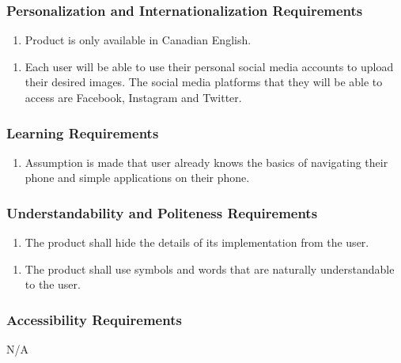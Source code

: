\documentclass[]{article}
\begin{document}
\subsubsection{Personalization and Internationalization Requirements}
\label{ssub:personalization_and_internationalization_requirements}
\begin{enumerate}[{UH}3. ]
	\item Product is only available in Canadian English.
\end{enumerate}
\begin{enumerate}[{UH}4. ]
\item Each user will be able to use their personal social media accounts to upload their desired images. The social media platforms that they will be able to access are Facebook, Instagram and Twitter.
\end{enumerate}

\subsubsection{Learning Requirements}
\label{ssub:learning_requirements}
\begin{enumerate}[{UH}5. ]
	\item Assumption is made that user already knows the basics of navigating their phone and simple applications on their phone.
\end{enumerate}

\subsubsection{Understandability and Politeness Requirements}
\label{ssub:understandability_and_politeness_requirements}
\begin{enumerate}[{UH}6. ]
	\item The product shall hide the details of its implementation from the user.

\end{enumerate}
\begin{enumerate}[{UH}7. ]
	\item The product shall use symbols and words that are naturally understandable to the user.
\end{enumerate}

\subsubsection{Accessibility Requirements}
\label{ssub:accessibility_requirements}
	N/A
\end{document}
